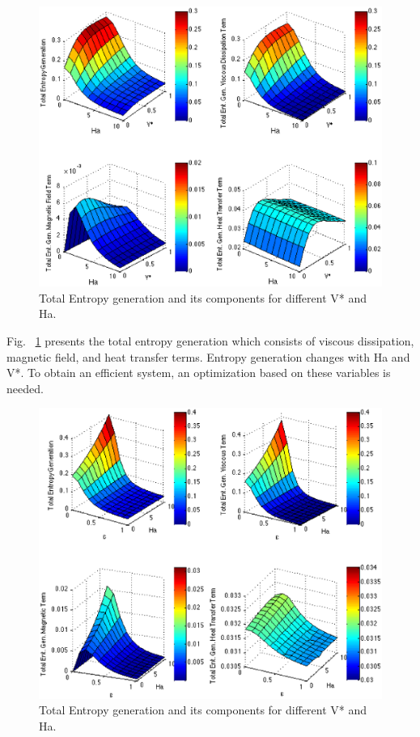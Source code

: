 \begin{figure}
  \includegraphics[scale=0.61]{figures/fig10.eps}
\caption{Total Entropy generation and its components for different V* and Ha.}
\label{fig:10}       %
\end{figure}

Fig. ~\ref{fig:10} presents the total entropy generation which consists of viscous dissipation, magnetic field, and heat transfer terms. Entropy generation changes with Ha and V*. To obtain an efficient system, an optimization based on these variables is needed.

\begin{figure}
  \includegraphics[scale=0.61]{figures/fig11.eps}
\caption{Total Entropy generation and its components for different V* and Ha.}
\label{fig:11}       %
\end{figure}

